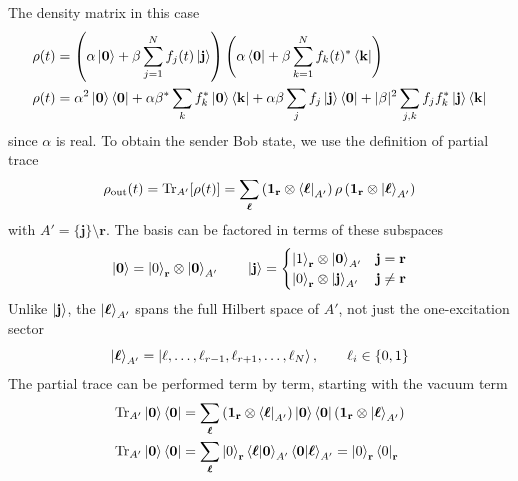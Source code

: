 \documentclass[../../../main.tex]{subfiles}
\begin{document}
The density matrix in this case
\begin{align*}
  \rho(t) & =
  \left(\alpha \ket{\mathbf{0 }} + \beta \sum_{j=1 } ^N f_j(t) \ket{\mathbf{\mathbf{j}}} \right)
  \left(\alpha \bra{\mathbf{0 }} + \beta \sum_{k=1 } ^N f_k(t) ^* \bra{\mathbf{\mathbf{k}}} \right)                                                                                                                                                    \\
  \rho(t) & = \alpha^2   \ket{\mathbf{0}}\bra{\mathbf{0}} + \alpha \beta^* \sum_k f_k^*  \ket{\mathbf{0}}\bra{\mathbf{k}} + \alpha \beta \sum_j f_j \ket{\mathbf{j}}\bra{\mathbf{0}} + |\beta|^2 \sum_{j,k} f_j f_k^* \ket{\mathbf{j}}\bra{\mathbf{k}}
\end{align*}
since $\alpha$ is real.
To obtain the sender Bob state, we use the definition of partial trace
\begin{equation*}
  \rho_{\text{out}} (t) = \mathrm{Tr} _{A'} [\rho(t)]
  = \sum_{\boldsymbol{\ell}} \left( \mathbf{1 }_\mathbf{r}\otimes\bra{\boldsymbol{\ell}}_{A'} \right) \rho \left( \mathbf{1 }_\mathbf{r}\otimes\ket{\boldsymbol{\ell}}_{A'} \right)
\end{equation*}
with $A' = \{\mathbf{j}\}\setminus \mathbf{r}$.
The basis can be factored in terms of these subspaces
\begin{equation*}
  \ket{\mathbf{0} } = \ket{0}_\mathbf{r} \otimes \ket{\mathbf{0} }_{A'}
  \qquad
  \ket{\mathbf{j} } =
  \begin{cases}
    \ket{1}_\mathbf{r} \otimes \ket{\mathbf{0} }_{A'} & \mathbf{j } = \mathbf{r}     \\
    \ket{0}_\mathbf{r} \otimes \ket{\mathbf{j} }_{A'} & \mathbf{j } \neq  \mathbf{r} \\
  \end{cases}
\end{equation*}
Unlike $\ket{\mathbf{j}}$, the $\ket{\boldsymbol{\ell}}_{A'}$ spans the full Hilbert space of $A'$, not just the one-excitation sector
\begin{equation*}
  \ket{\boldsymbol{\ell}}_{A'} = \ket{\ell,\dots,\ell_{r-1},\ell_{r+1},\dots,\ell_{N}}, \qquad\ell_i \in \{0,1\}
\end{equation*}
The partial trace can be performed term by term, starting with the vacuum term
\begin{align*}
  \mathrm{Tr} _{A'} \ket{\mathbf{0}}\bra{\mathbf{0}}
   & = \sum_{\boldsymbol{\ell}} \left( \mathbf{1 }_\mathbf{r}\otimes\bra{\boldsymbol{\ell}}_{A'} \right)\ket{\mathbf{0}}\bra{\mathbf{0}} \left( \mathbf{1 }_\mathbf{r}\otimes\ket{\boldsymbol{\ell}}_{A'} \right) \\
  \mathrm{Tr} _{A'} \ket{\mathbf{0}}\bra{\mathbf{0}}
   & = \sum_{\boldsymbol{\ell}} \ket{0}_\mathbf{r}  \braket{\boldsymbol{\ell}| \mathbf{0}}_{A'} \braket{\mathbf{0}| \boldsymbol{\ell}}_{A'}
  = \ket{0}_\mathbf{r} \bra{0}_\mathbf{r}
\end{align*}
\end{document}
